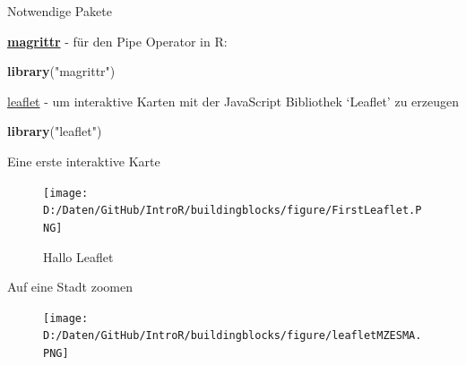 \documentclass[ignorenonframetext,]{beamer}
\newenvironment{Shaded}{\begin{snugshade}}{\end{snugshade}}
\newcommand{\KeywordTok}[1]{\textcolor[rgb]{0.26,0.66,0.93}{\textbf{#1}}}
\newcommand{\DataTypeTok}[1]{\textcolor[rgb]{0.74,0.68,0.62}{\underline{#1}}}
\newcommand{\FloatTok}[1]{\textcolor[rgb]{0.27,0.67,0.26}{#1}}
\newcommand{\StringTok}[1]{\textcolor[rgb]{0.02,0.61,0.04}{#1}}
\newcommand{\OperatorTok}[1]{\textcolor[rgb]{0.74,0.68,0.62}{#1}}
\newcommand{\NormalTok}[1]{\textcolor[rgb]{0.74,0.68,0.62}{#1}}
\begin{document}
\begin{frame}[fragile]{Notwendige Pakete}

\begin{block}{\href{https://cran.r-project.org/web/packages/magrittr/index.html}{\textbf{magrittr}}
- für den Pipe Operator in R:}

\begin{Shaded}
\begin{Highlighting}[]
\KeywordTok{library}\NormalTok{(}\StringTok{"magrittr"}\NormalTok{)}
\end{Highlighting}
\end{Shaded}

\href{https://rstudio.github.io/leaflet/}{leaflet} - um interaktive
Karten mit der JavaScript Bibliothek `Leaflet' zu erzeugen

\begin{Shaded}
\begin{Highlighting}[]
\KeywordTok{library}\NormalTok{(}\StringTok{"leaflet"}\NormalTok{)}
\end{Highlighting}
\end{Shaded}

\end{block}

\end{frame}

\begin{frame}[fragile]{Eine erste interaktive Karte}

\begin{Shaded}
\end{Shaded}

\begin{figure}
\centering
\texttt{[image: D:/Daten/GitHub/IntroR/buildingblocks/figure/FirstLeaflet.PNG]}
\caption{Hallo Leaflet}
\end{figure}

\end{frame}

\begin{frame}[fragile]{Auf eine Stadt zoomen}

\begin{Shaded}
\end{Shaded}

\begin{figure}
\centering
\texttt{[image: D:/Daten/GitHub/IntroR/buildingblocks/figure/leafletMZESMA.PNG]}
\caption{}
\end{figure}

\end{frame}
\end{document}
